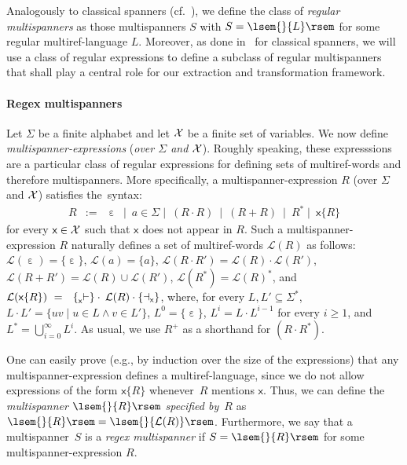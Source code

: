 \documentclass[
a4paper
]{article}
\theoremstyle{plain}
\theoremstyle{definition}
\theoremstyle{remark}
\DeclareMathOperator{\eword}{\varepsilon}
\newcommand{\varset}{\mbox{\ensuremath{\mathcal{X}}}}
\DeclareMathOperator{\openmark}{\vdash}
\DeclareMathOperator{\closemark}{\dashv}
\newcommand{\open}[1]{\prescript{}{#1}{\openmark}}
\newcommand{\close}[1]{\closemark_{#1}}
\newcommand{\varsx}{\ensuremath{\textsf{x}}}
\newcommand{\lang}[1]{\ensuremath{\mathcal{L}(#1)}}
\newcommand{\sem}[1]{{\lsem{}{#1}\rsem}}
\begin{document}
Analogously to classical spanners
(cf.\ \cite{SchmidSchweikardt_ICDT21,FreydenbergerThompson2020, Freydenberger2019, DoleschalEtAl2019, SchmidSchweikardt_Gems}),
we 
define the class of \emph{regular multispanners} as those multispanners $S$ with $S = \sem{L}$ for some regular multiref-language $L$. Moreover, as
done in~\cite{fagin2015document} for classical spanners, we
will
use a class of regular expressions to define a subclass of regular multispanners that shall play a central role for our extraction and transformation framework.

\paragraph{Regex multispanners} Let $\Sigma$ be a finite alphabet and let $\varset$ be a finite set of variables. We now define 
\emph{multispanner-expressions} (\emph{over $\Sigma$ and $\varset$}). Roughly speaking, these expresssions are a
particular class of regular expressions for defining
sets of
multiref-words and therefore multispanners. 
More
specifically,
a multispanner-expression $R$ (over $\Sigma$ and $\varset$) satisfies the~syntax:
\[
\begin{array}{rcl}
	R & := & \eword \ \mid \ a \in \Sigma \mid \ (R \cdot R) \ \mid \ (R + R) \ \mid \ R^* \mid \ \varsx\{R\}
\end{array}
\]
for every $\varsx \in \varset$ such that $\varsx$ does not appear in $R$.
Such
a multispanner-expression $R$ naturally defines a set of multiref-words $\lang{R}$ as follows: $\lang{\eword} = \{\eword\}$, $\lang{a} = \{a\}$, $\lang{R \cdot R'} = \lang{R}\cdot \lang{R'}$, $\lang{R + R'} = \lang{R} \cup \lang{R'}$, $\lang{R^*} = \lang{R}^*$, and $\lang{\varsx\{R\}} \ = \ \ \{\open{\varsx}\} \cdot \: \lang{R} \cdot \{\close{\varsx}\}$,
where, for every $L, L' \subseteq \Sigma^*$, $L \cdot L' = \{uv \mid u \in L \wedge v \in L'\}$, $L^0 = \{\eword\}$, $L^i = L \cdot L^{i-1}$ for every $i \geq 1$, and $L^* = \bigcup_{i=0}^{\infty} L^i$. As usual, we use $R^+$ as a shorthand for $(R\cdot R^*)$.

One can easily prove (e.g., by induction over the size of the expressions) that any multispanner-expression defines a multiref-language, since we do not allow expressions of the form $\varsx\{R\}$ whenever~$R$ mentions $\varsx$. 
Thus, we can
define the \emph{multispanner $\sem{R}$ specified by~$R$} as $\sem{R} = \sem{\lang{R}}$.
Furthermore, we say that a multispanner~$S$ is a \emph{regex multispanner} if $S = \sem{R}$ for some multispanner-expression $R$. 
\end{document}
